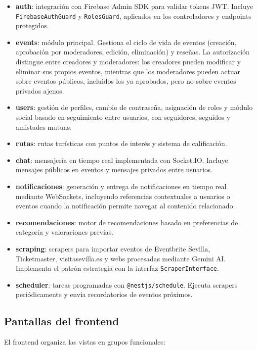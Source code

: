 \begin{itemize}
    \item \textbf{auth}: integración con Firebase Admin SDK para validar tokens JWT. Incluye \texttt{FirebaseAuthGuard} y \texttt{RolesGuard}, aplicados en los controladores y endpoints protegidos.
    \item \textbf{events}: módulo principal. Gestiona el ciclo de vida de eventos (creación, aprobación por moderadores, edición, eliminación) y reseñas. La autorización distingue entre creadores y moderadores: los creadores pueden modificar y eliminar sus propios eventos, mientras que los moderadores pueden actuar sobre eventos públicos, incluidos los ya aprobados, pero no sobre eventos privados ajenos.
    \item \textbf{users}: gestión de perfiles, cambio de contraseña, asignación de roles y módulo social basado en seguimiento entre usuarios, con seguidores, seguidos y amistades mutuas.
    \item \textbf{rutas}: rutas turísticas con puntos de interés y sistema de calificación.
    \item \textbf{chat}: mensajería en tiempo real implementada con Socket.IO. Incluye mensajes públicos en eventos y mensajes privados entre usuarios.
    \item \textbf{notificaciones}: generación y entrega de notificaciones en tiempo real mediante WebSockets, incluyendo referencias contextuales a usuarios o eventos cuando la notificación permite navegar al contenido relacionado.
    \item \textbf{recomendaciones}: motor de recomendaciones basado en preferencias de categoría y valoraciones previas.
    \item \textbf{scraping}: scrapers para importar eventos de Eventbrite Sevilla, Ticketmaster, visitasevilla.es y webs procesadas mediante Gemini AI. Implementa el patrón estrategia con la interfaz \texttt{ScraperInterface}.
    \item \textbf{scheduler}: tareas programadas con \texttt{@nestjs/schedule}. Ejecuta scrapers periódicamente y envía recordatorios de eventos próximos.
\end{itemize}

\subsection{Pantallas del frontend}

El frontend organiza las vistas en grupos funcionales:

